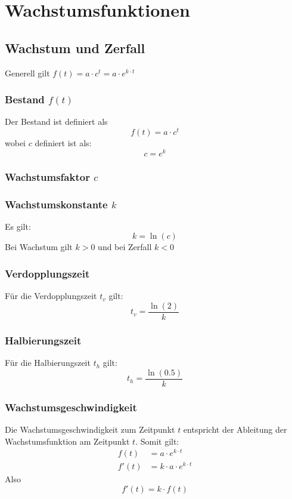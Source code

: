 \documentclass[a4paper,12pt]{article}
\begin{document}
\section{Wachstumsfunktionen}


\subsection{Wachstum und Zerfall}
Generell gilt $f(t) = a \cdot c^t = a \cdot e^{k \cdot t}$ 
\subsubsection{Bestand $f(t)$}
Der Bestand ist definiert als
$$f(t) = a \cdot c^t$$
wobei $c$ definiert ist als:
$$c = e^k$$
\subsubsection{Wachstumsfaktor $c$}
\subsubsection{Wachstumskonstante $k$}
Es gilt:
$$k = \ln{(c)}$$
Bei Wachstum gilt $k > 0$ und bei Zerfall $k < 0$
\subsubsection{Verdopplungszeit}
Für die Verdopplungszeit $t_v$ gilt:
$$t_v = \frac{\ln{(2)}}{k}$$
\subsubsection{Halbierungszeit}
Für die Halbierungszeit $t_h$ gilt:
$$t_h = \frac{\ln{(0.5)}}{k}$$
\pagebreak
\subsubsection{Wachstumsgeschwindigkeit}
Die Wachstumsgeschwindigkeit zum Zeitpunkt $t$ entspricht der Ableitung der Wachstumsfunktion am Zeitpunkt $t$.
Somit gilt:
\begin{equation*}
\begin{split}
f(t) & = a \cdot e^{k \cdot t}\\
f'(t) &= k \cdot a \cdot e^{k \cdot t}
\end{split}
\end{equation*}
Also $$f'(t) = k \cdot f(t)$$
\end{document}
